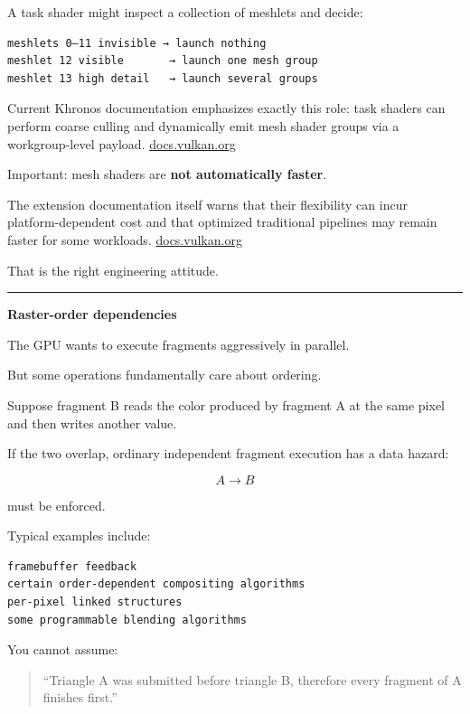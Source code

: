 A task shader might inspect a collection of meshlets and decide:

\begin{verbatim}
meshlets 0–11 invisible → launch nothing
meshlet 12 visible       → launch one mesh group
meshlet 13 high detail   → launch several groups
\end{verbatim}

Current Khronos documentation emphasizes exactly this role: task shaders can perform coarse culling and dynamically emit mesh shader groups via a workgroup-level payload. \href{https://docs.vulkan.org/features/latest/features/proposals/VK_EXT_mesh_shader.html?utm_source=chatgpt.com}{docs.vulkan.org}

Important: mesh shaders are \textbf{not automatically faster}.

The extension documentation itself warns that their flexibility can incur platform-dependent cost and that optimized traditional pipelines may remain faster for some workloads. \href{https://docs.vulkan.org/features/latest/features/proposals/VK_EXT_mesh_shader.html?utm_source=chatgpt.com}{docs.vulkan.org}

That is the right engineering attitude.

\begin{center}\rule{0.5\linewidth}{0.5pt}\end{center}

\textbf{Raster-order dependencies}

The GPU wants to execute fragments aggressively in parallel.

But some operations fundamentally care about ordering.

Suppose fragment B reads the color produced by fragment A at the same pixel and then writes another value.

If the two overlap, ordinary independent fragment execution has a data hazard:

\[
A\rightarrow B
\]

must be enforced.

Typical examples include:

\begin{verbatim}
framebuffer feedback
certain order-dependent compositing algorithms
per-pixel linked structures
some programmable blending algorithms
\end{verbatim}

You cannot assume:

\begin{quote}
``Triangle A was submitted before triangle B, therefore every fragment of A finishes first.''
\end{quote}

